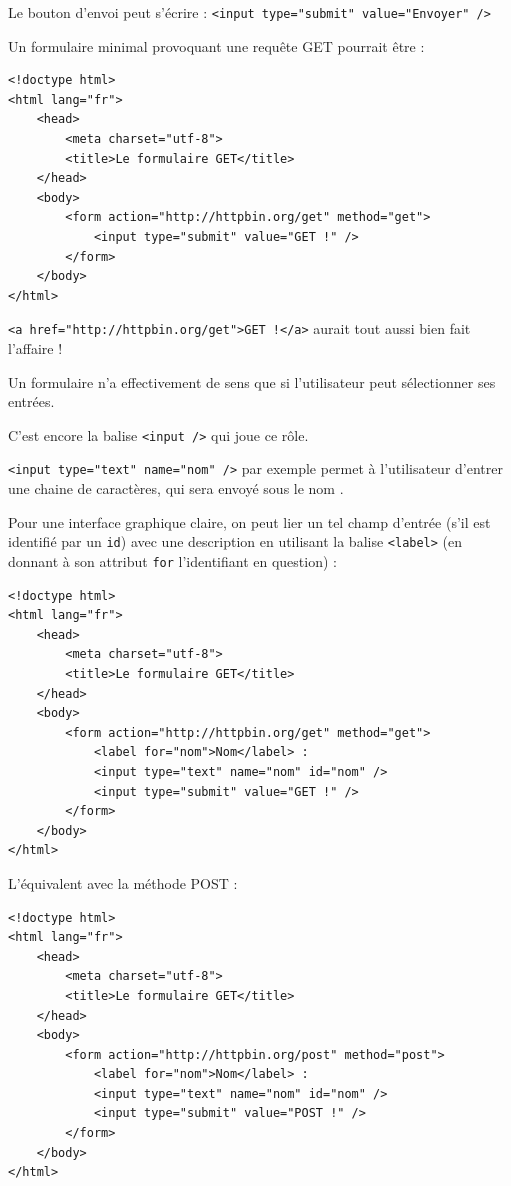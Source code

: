 Le bouton d'envoi peut s'écrire : \texttt{<input type="submit" value="Envoyer" />}

Un formulaire minimal provoquant une requête GET pourrait être :

\vspace{-2ex}
\begin{verbatim}
<!doctype html>
<html lang="fr">
    <head>
        <meta charset="utf-8">
        <title>Le formulaire GET</title>
    </head>
    <body>
        <form action="http://httpbin.org/get" method="get">
            <input type="submit" value="GET !" />
        </form>
    </body>
</html>
\end{verbatim}

\texttt{<a href="http://httpbin.org/get">GET !</a>} aurait tout aussi bien fait l'affaire !

Un formulaire n'a effectivement de sens que si l'utilisateur peut sélectionner ses entrées.

C'est encore la balise \texttt{<input />} qui joue ce rôle.

\texttt{<input type="text" name="nom" />} par exemple permet à l'utilisateur d'entrer une chaine de caractères, qui sera envoyé sous le nom .

Pour une interface graphique claire, on peut lier un tel champ d'entrée (s'il est identifié par un \texttt{id}) avec une description en utilisant la balise \texttt{<label>} (en donnant à son attribut \texttt{for} l'identifiant en question) :

\vspace{-2ex}
\begin{verbatim}
<!doctype html>
<html lang="fr">
    <head>
        <meta charset="utf-8">
        <title>Le formulaire GET</title>
    </head>
    <body>
        <form action="http://httpbin.org/get" method="get">
            <label for="nom">Nom</label> :
            <input type="text" name="nom" id="nom" />
            <input type="submit" value="GET !" />
        </form>
    </body>
</html>
\end{verbatim}

L'équivalent avec la méthode POST :

\vspace{-2ex}
\begin{verbatim}
<!doctype html>
<html lang="fr">
    <head>
        <meta charset="utf-8">
        <title>Le formulaire GET</title>
    </head>
    <body>
        <form action="http://httpbin.org/post" method="post">
            <label for="nom">Nom</label> :
            <input type="text" name="nom" id="nom" />
            <input type="submit" value="POST !" />
        </form>
    </body>
</html>
\end{verbatim}

